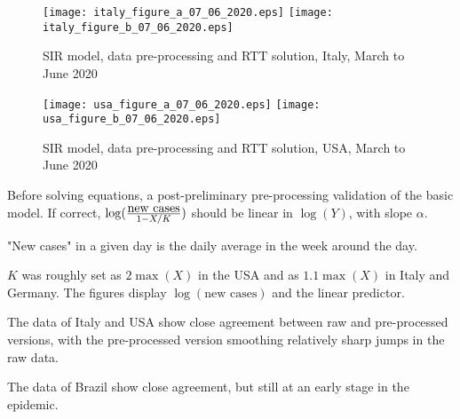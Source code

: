 \documentclass{article}
\begin{document}
\begin{figure}
\begin{center}
{\texttt{[image: italy\_figure\_a\_07\_06\_2020.eps]}}
\qquad
{\texttt{[image: italy\_figure\_b\_07\_06\_2020.eps]}}
\end{center}
\begin{center}
\caption{SIR model, data pre-processing and RTT solution, Italy, March to June 2020
}
\label{fig:italy_sir_model_07_06_2020}
\end{center}
\end{figure}


\begin{figure}
\begin{center}
{\texttt{[image: usa\_figure\_a\_07\_06\_2020.eps]}}
\qquad
{\texttt{[image: usa\_figure\_b\_07\_06\_2020.eps]}}
\end{center}
\begin{center}
\caption{SIR model, data pre-processing and RTT solution, USA, March to June 2020
}
\label{fig:usa_sir_model_07_06_2020}
\end{center}
\end{figure}

\newpage

\noindent Before solving equations, a post-preliminary pre-processing validation of the basic model. If correct, $\log({{\mbox{new cases}} \over {1-X/K}})$ should be linear in $\log(Y)$, with slope $\alpha$.

\bigskip

\noindent "New cases" in a given day is the daily average in the week around the day.

\bigskip

\noindent $K$ was roughly set as $2 \max(X)$ in the USA and as $1.1 \max(X)$ in Italy and Germany. The figures display $\log(\mbox{new cases})$ and the linear predictor.

\newpage

\noindent The data of Italy and USA show close agreement between raw and pre-processed versions, with the pre-processed version smoothing relatively sharp jumps in the raw data.

\bigskip

\noindent The data of Brazil show close agreement, but still at an early stage in the epidemic.
\end{document}
